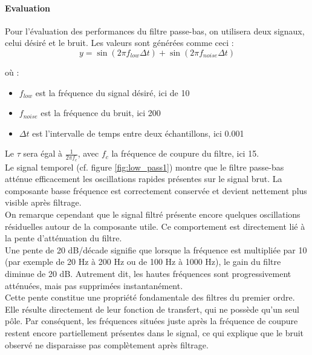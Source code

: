 \paragraph{Evaluation}

Pour l'évaluation des performances du filtre passe-bas, on utilisera deux signaux, celui désiré et le bruit. Les valeurs sont générées comme ceci :
\begin{equation}
    y = \sin(2 \pi f_{low} \Delta t) + \sin(2 \pi f_{noise} \Delta t)
\end{equation}

où :
\begin{itemize}
    \item $f_{low}$ est la fréquence du signal désiré, ici de 10
    \item $f_{noise}$ est la fréquence du bruit, ici 200
    \item $\Delta t$ est l'intervalle de temps entre deux échantillons, ici 0.001
\end{itemize}

Le $\tau$ sera égal à $\frac{1}{2 \pi f_c}$, avec $f_c$ la fréquence de coupure du filtre, ici 15. \\

Le signal temporel (cf. figure \ref{fig:low_pass1}) montre que le filtre passe-bas atténue efficacement 
les oscillations rapides présentes sur le signal brut. La composante basse fréquence est correctement 
conservée et devient nettement plus visible après filtrage. \\

On remarque cependant que le signal filtré présente encore quelques oscillations résiduelles autour de la composante utile. Ce comportement est directement lié à la pente d'atténuation du filtre. \\

Une pente de 20 dB/décade signifie que lorsque la fréquence est multipliée par 10 (par exemple de 20 Hz à 200 Hz ou de 100 Hz à 1000 Hz), le gain du filtre diminue de 20 dB. Autrement dit, les hautes fréquences sont progressivement atténuées, mais pas supprimées instantanément. \\

Cette pente constitue une propriété fondamentale des filtres du premier ordre. Elle résulte directement de leur fonction de transfert, qui ne possède qu'un seul pôle. Par conséquent, les fréquences situées juste après la fréquence de coupure restent encore partiellement présentes dans le signal, ce qui explique que le bruit observé ne disparaisse pas complètement après filtrage. \\


